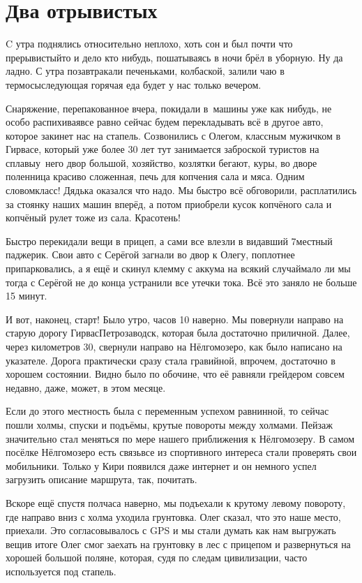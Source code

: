 \chapter{Два отрывистых}
\vepsianrose

C утра поднялись относительно неплохо, хоть сон и был почти что прерывистый\mdash то и дело кто нибудь, пошатываясь в ночи брёл в уборную. Ну да ладно. С утра позавтракали печеньками, колбаской, залили чаю в термосы\mdash следующая горячая еда будет у нас только вечером. 

Снаряжение, перепакованное вчера, покидали в~машины уже как нибудь, не особо распихивая\mdash все равно сейчас будем перекладывать всё в другое авто, которое закинет нас на стапель. Созвонились с Олегом, классным мужичком в Гирвасе, который уже более 30 лет тут занимается заброской туристов на сплавы\mdash у~него двор большой, хозяйство, козлятки бегают, куры, во дворе поленница красиво сложенная, печь для копчения сала и мяса. Одним словом\mdash класс! Дядька оказался что надо. Мы быстро всё обговорили, расплатились за стоянку наших машин вперёд, а потом приобрели кусок копчёного сала и копчёный рулет тоже из сала. Кра\sdash со\sdash тень! 

Быстро перекидали вещи в прицеп, а сами все влезли в видавший 7\sdash местный паджерик. Свои авто с Серёгой загнали во двор к Олегу, поплотнее припарковались, а я ещё и скинул клемму с аккума на всякий случай\mdash мало ли мы тогда с Серёгой не до конца устранили все утечки тока. Всё это заняло не больше 15 минут.

И вот, наконец, старт! Было утро, часов 10 наверно. Мы повернули направо на старую дорогу Гирвас\mdash Петрозаводск, которая была достаточно приличной. Далее, через километров 30, свернули направо на Нёлгомозеро, как было написано на указателе. Дорога практически сразу стала гравийной, впрочем, достаточно в хорошем состоянии. Видно было по обочине, что её равняли грейдером совсем недавно, даже, может, в этом месяце.

Если до этого местность была с переменным успехом равнинной, то сейчас пошли холмы, спуски и подъёмы, крутые повороты между холмами. Пейзаж значительно стал меняться по мере нашего приближения к Нёлгомозеру. В самом посёлке Нёлгомозеро есть связь\mdash все из спортивного интереса стали проверять свои мобильники. Только у Кири появился даже интернет и он немного успел загрузить описание маршрута, так, почитать. 

Вскоре ещё спустя полчаса наверно, мы подъехали к крутому левому повороту, где направо вниз с холма уходила грунтовка. Олег сказал, что это наше место, приехали. Это согласовывалось с GPS и мы стали думать как нам выгружать вещи\mdash в итоге Олег смог заехать на грунтовку в лес с прицепом и развернуться на хорошей большой поляне, которая, судя по следам цивилизации, часто используется под стапель.

